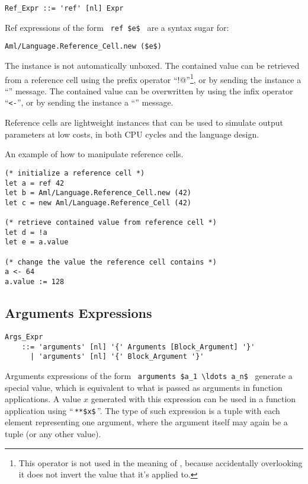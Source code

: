 \grammar\begin{lstlisting}
Ref_Expr ::= 'ref' [nl] Expr
\end{lstlisting}

Ref expressions of the form ~\lstinline!ref $e$!~ are a syntax sugar for:
\begin{lstlisting}[deletekeywords={new}]
Aml/Language.Reference_Cell.new ($e$)
\end{lstlisting}

The  instance is not automatically unboxed. The contained value can be retrieved from a reference cell using the prefix operator ``\lstinline@!@''\footnote{This operator is not used in the meaning of , because accidentally overlooking it does not invert the value that it's applied to.}, or by sending the instance a ``'' message. The contained value can be overwritten by using the infix operator ``\lstinline!<-!'', or by sending the instance a ``'' message. 

Reference cells are lightweight instances that can be used to simulate output parameters at low costs, in both CPU cycles and the language design.

\example An example of how to manipulate reference cells. 
\begin{lstlisting}
(* initialize a reference cell *)
let a = ref 42
let b = Aml/Language.Reference_Cell.new (42)
let c = new Aml/Language.Reference_Cell (42)

(* retrieve contained value from reference cell *)
let d = !a
let e = a.value

(* change the value the reference cell contains *)
a <- 64
a.value := 128
\end{lstlisting}





\subsection{Arguments Expressions}
\label{sec:arguments-expressions}

\grammar\begin{lstlisting}
Args_Expr 
    ::= 'arguments' [nl] '{' Arguments [Block_Argument] '}' 
      | 'arguments' [nl] '{' Block_Argument '}'
\end{lstlisting}

Arguments expressions of the form ~\lstinline!arguments $a_1 \ldots a_n$!~ generate a special value, which is equivalent to what is passed as arguments in function applications. A value $x$ generated with this expression can be used in a function application using ``\,\lstinline!**$x$!\,''. The type of such expression is a tuple with each element representing one argument, where the argument itself may again be a tuple (or any other value). 





